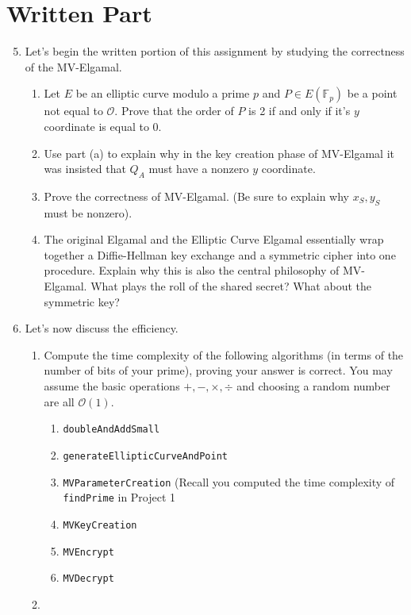 \documentclass[11pt]{article}
\newcommand{\bF}{\mathbb{F}}
\newcommand{\cO}{\mathcal{O}}
\begin{document}
\section*{Written Part}
\begin{enumerate}
  \setcounter{enumi}{4}
  \item{Let's begin the written portion of this assignment by studying the correctness of the MV-Elgamal.
  \begin{enumerate}
    \item{
    Let $E$ be an elliptic curve modulo a prime $p$ and $P\in E(\bF_p)$ be a point not equal to $\cO$.  Prove that the order of $P$ is 2 if and only if it's $y$ coordinate is equal to 0.}
    \item{
    Use part (a) to explain why in the key creation phase of MV-Elgamal it was insisted that $Q_A$ must have a nonzero $y$ coordinate.
    }
    \item{
    Prove the correctness of MV-Elgamal.  (Be sure to explain why $x_S,y_S$ must be nonzero).
    }
    \item{
    The original Elgamal and the Elliptic Curve Elgamal essentially wrap together a Diffie-Hellman key exchange and a symmetric cipher into one procedure.  Explain why this is also the central philosophy of MV-Elgamal.  What plays the roll of the shared secret?  What about the symmetric key?
    }
  \end{enumerate}
  }
  \item{Let's now discuss the efficiency.
  \begin{enumerate}
    \item{Compute the time complexity of the following algorithms (in terms of the number of bits of your prime), proving your answer is correct.  You may assume the basic operations $+,-,\times,\div$ and choosing a random number are all $\cO(1)$. 
    \begin{enumerate}
    \item{\verb|doubleAndAddSmall|}
    \item{\verb|generateEllipticCurveAndPoint|}
    \item{\verb|MVParameterCreation| (Recall you computed the time complexity of \verb|findPrime| in Project 1}
    \item{\verb|MVKeyCreation|}
    \item{\verb|MVEncrypt|}
    \item{\verb|MVDecrypt|}
    \end{enumerate}
    }
    \item{
}
\end{enumerate}}
\end{enumerate}
\end{document}
